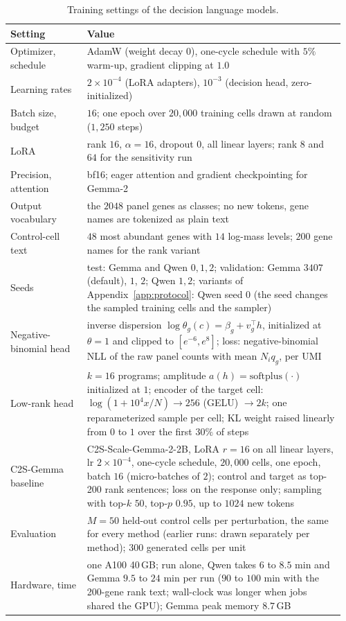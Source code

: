 \begin{table}[!htb]
\centering
\scriptsize
\begin{tabular}{@{}p{0.22\linewidth}p{0.74\linewidth}@{}}
\toprule
Setting & Value \\
\midrule
Optimizer, schedule & AdamW (weight decay $0$), one-cycle schedule with $5\%$ warm-up, gradient clipping at $1.0$ \\
Learning rates & $2\times10^{-4}$ (LoRA adapters), $10^{-3}$ (decision head, zero-initialized) \\
Batch size, budget & $16$; one epoch over $20{,}000$ training cells drawn at random ($1{,}250$ steps) \\
LoRA & rank $16$, $\alpha=16$, dropout $0$, all linear layers; rank $8$ and $64$ for the sensitivity run \\
Precision, attention & bf16; eager attention and gradient checkpointing for Gemma-2 \\
Output vocabulary & the $2048$ panel genes as classes; no new tokens, gene names are tokenized as plain text \\
Control-cell text & $48$ most abundant genes with $14$ log-mass levels; $200$ gene names for the rank variant \\
Seeds & test: Gemma and Qwen $0,1,2$; validation: Gemma $3407$ (default), $1$, $2$; Qwen $1,2$; variants of Appendix~\ref{app:protocol}: Qwen seed $0$ (the seed changes the sampled training cells and the sampler) \\
Negative-binomial head & inverse dispersion $\log\theta_g(c)=\beta_g+v_g^\top h$, initialized at $\theta=1$ and clipped to $[e^{-6},e^{8}]$; loss: negative-binomial NLL of the raw panel counts with mean $N_iq_g$, per UMI \\
Low-rank head & $k=16$ programs; amplitude $a(h)=\mathrm{softplus}(\cdot)$ initialized at $1$; encoder of the target cell: $\log(1+10^4x/N)\to256$ (GELU) $\to2k$; one reparameterized sample per cell; KL weight raised linearly from $0$ to $1$ over the first $30\%$ of steps \\
C2S-Gemma baseline & C2S-Scale-Gemma-2-2B, LoRA $r=16$ on all linear layers, lr $2\times10^{-4}$, one-cycle schedule, $20{,}000$ cells, one epoch, batch $16$ (micro-batches of $2$); control and target as top-200 rank sentences; loss on the response only; sampling with top-$k$ $50$, top-$p$ $0.95$, up to $1024$ new tokens \\
Evaluation & $M=50$ held-out control cells per perturbation, the same for every method (earlier runs: drawn separately per method); $300$ generated cells per unit \\
Hardware, time & one A100 40\,GB; run alone, Qwen takes $6$ to $8.5$ min and Gemma $9.5$ to $24$ min per run ($90$ to $100$ min with the 200-gene rank text; wall-clock was longer when jobs shared the GPU); Gemma peak memory $8.7$\,GB \\
\bottomrule
\end{tabular}
\caption{Training settings of the decision language models.}
\label{tab:train}
\end{table}

